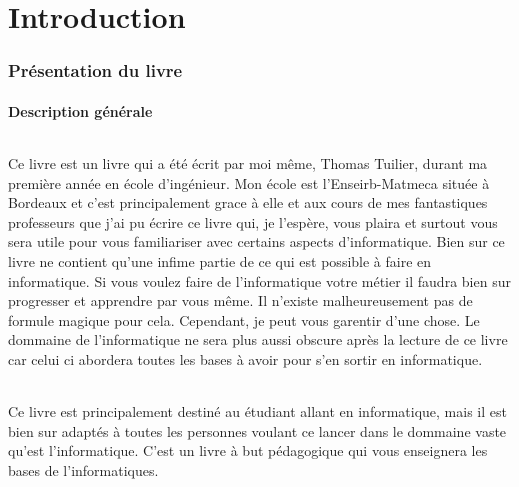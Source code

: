 \documentclass{article}
\begin{document}






\newpage

\part{Introduction}

\section{Pr\'esentation du livre}
\subsection{Description g\'en\'erale}

\paragraph{}                          
Ce livre est un livre qui a été écrit par moi m\^eme, Thomas Tuilier, durant ma premi\`ere ann\'ee en \'ecole d'ing\'enieur. Mon \'ecole est l'Enseirb-Matmeca situ\'ee à Bordeaux et c'est principalement grace à elle et aux cours de mes fantastiques professeurs que j'ai pu \'ecrire ce livre qui, je l'esp\`ere, vous plaira et surtout vous sera utile pour vous familiariser avec certains aspects d'informatique. Bien sur ce livre ne contient qu'une infime partie de ce qui est possible à faire en informatique. Si vous voulez faire de l'informatique votre m\'etier il faudra bien sur progresser et apprendre par vous m\^eme. Il n'existe malheureusement pas de formule magique pour cela. Cependant, je peut vous garentir d'une chose. Le dommaine de l'informatique ne sera plus aussi obscure après la lecture de ce livre car celui ci abordera toutes les bases à avoir pour s'en sortir en informatique.

\paragraph{}  
Ce livre est principalement destin\'e au \'etudiant allant en informatique, mais il est bien sur adapt\'es à toutes les personnes voulant ce lancer dans le dommaine vaste qu'est l'informatique. C'est un livre \`a but p\'edagogique qui vous enseignera les bases de l'informatiques. 
\end{document}
